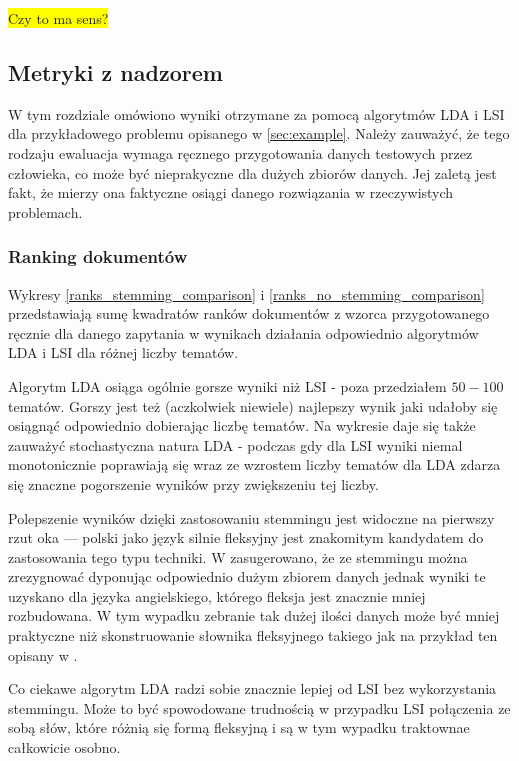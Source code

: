 \documentclass[11pt,a4paper]{article}
\newcommand{\todo}[1]{\colorbox{yellow}{#1}}
\begin{document}
\todo{Czy to ma sens?}

\subsection{Metryki z nadzorem}

W tym rozdziale omówiono wyniki otrzymane za pomocą algorytmów LDA i LSI dla
przykładowego problemu opisanego w \ref{sec:example}. Należy zauważyć, że tego
rodzaju ewaluacja wymaga ręcznego przygotowania danych testowych przez
człowieka, co może być nieprakyczne dla dużych zbiorów danych.  Jej zaletą jest
fakt, że mierzy ona faktyczne osiągi danego rozwiązania w rzeczywistych
problemach.

\subsubsection{Ranking dokumentów}

Wykresy \ref{ranks_stemming_comparison} i \ref{ranks_no_stemming_comparison}
przedstawiają sumę kwadratów ranków dokumentów z wzorca przygotowanego ręcznie
dla danego zapytania w wynikach działania odpowiednio algorytmów LDA i LSI dla
różnej liczby tematów.

Algorytm LDA osiąga ogólnie gorsze wyniki niż LSI - poza przedziałem $50 - 100$
tematów. Gorszy jest też (aczkolwiek niewiele) najlepszy wynik jaki udałoby się
osiągnąć odpowiednio dobierając liczbę tematów. Na wykresie daje się także
zauważyć stochastyczna natura LDA - podczas gdy dla LSI wyniki niemal
monotonicznie poprawiają się wraz ze wzrostem liczby tematów dla LDA zdarza się
znaczne pogorszenie wyników przy zwiększeniu tej liczby.

Polepszenie wyników dzięki zastosowaniu stemmingu jest widoczne na pierwszy
rzut oka --- polski jako język silnie fleksyjny jest znakomitym kandydatem do
zastosowania tego typu techniki. W \cite{manning-schuetze} zasugerowano, że ze
stemmingu można zrezygnować dyponując odpowiednio dużym zbiorem danych jednak
wyniki te uzyskano dla języka angielskiego, którego fleksja jest znacznie mniej
rozbudowana. W tym wypadku zebranie tak dużej ilości danych może być mniej
praktyczne niż skonstruowanie słownika fleksyjnego takiego jak na przykład ten
opisany w \cite{pisarek-slownik}.

Co ciekawe algorytm LDA radzi sobie znacznie lepiej od LSI bez wykorzystania
stemmingu.  Może to być spowodowane trudnością w przypadku LSI połączenia ze
sobą słów, które różnią się formą fleksyjną i są w tym wypadku traktownae
całkowicie osobno.
\end{document}
